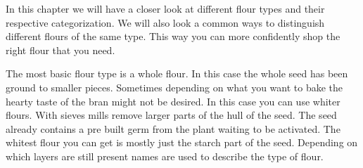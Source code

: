 In this chapter we will have a closer look at different flour types
and their respective categorization. We will also look a common
ways to distinguish different flours of the same type. This way you can more confidently
shop the right flour that you need.

The most basic flour type is a whole flour. In this case the whole seed has
been ground to smaller pieces. Sometimes depending on what you want to bake
the hearty taste of the bran might not be desired. In this case you can use
whiter flours. With sieves mills remove larger parts of the hull of the seed.
The seed already contains a pre built germ from the plant waiting to be
activated. The whitest flour you can get is mostly just the starch part of the seed.
Depending on which layers are still present names are used to describe the
type of flour.

\begin{table}[htb!]
\centering
{}
\caption{\label{tab:flour-types-comparison}A comparison of the different wheat flour types}
\end{table}

